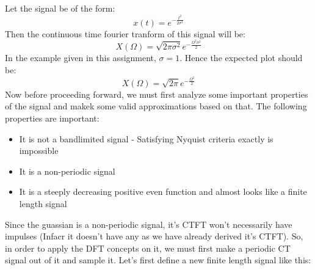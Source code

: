 \documentclass[12pt, a4paper]{article}
\begin{document}
Let the signal be of the form:
\begin{equation*}
    x(t) = e^{-\frac{t^{2}}{2\sigma^{2}}}
\end{equation*}
Then the continuous time fourier tranform of this signal will be:
\begin{equation*}
    X(\Omega) = \sqrt{2\pi\sigma^{2}}e^{-\frac{\Omega^{2}\sigma^{2}}{2}}
\end{equation*}
In the example given in this assignment, $\sigma=1$. Hence the expected plot should be:
\begin{equation*}
    X(\Omega) = \sqrt{2\pi}e^{-\frac{\Omega^{2}}{2}}
\end{equation*}
Now before proceeding forward, we must first analyze some important properties of the signal and makek some valid approximations based on that. The following properties are important:
\begin{itemize}
    \item It is not a bandlimited signal - Satisfying Nyquist criteria exactly is impossible
    \item It is a non-periodic signal
    \item It is a steeply decreasing positive even function and almost looks like a finite length signal
\end{itemize}
Since the guassian is a non-periodic signal, it's CTFT won't necessarily have impulses (Infacr it doesn't have any as we have already derived it's CTFT). So, in order to apply the DFT concepts on it, we must first make a periodic CT signal out of it and sample it. Let's first define a new finite length signal like this:
\end{document}
